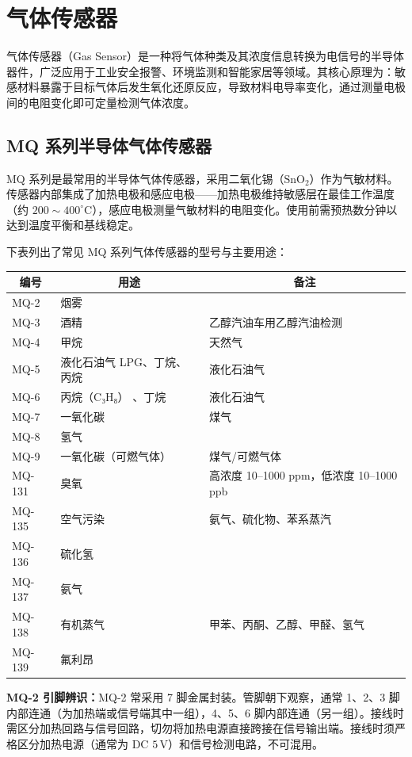 \section{气体传感器}
\label{sec:gas_sensors}

气体传感器（Gas Sensor）是一种将气体种类及其浓度信息转换为电信号的半导体器件，广泛应用于工业安全报警、环境监测和智能家居等领域。其核心原理为：敏感材料暴露于目标气体后发生氧化还原反应，导致材料电导率变化，通过测量电极间的电阻变化即可定量检测气体浓度。

\subsection{MQ 系列半导体气体传感器}

MQ 系列是最常用的半导体气体传感器，采用二氧化锡（$\mathrm{SnO_2}$）作为气敏材料。传感器内部集成了加热电极和感应电极——加热电极维持敏感层在最佳工作温度（约 $200\sim400^\circ\mathrm{C}$），感应电极测量气敏材料的电阻变化。使用前需预热数分钟以达到温度平衡和基线稳定。

下表列出了常见 MQ 系列气体传感器的型号与主要用途：

\vspace{0.5em}
\begin{center}
\begin{tabular}{lll}
\hline
\multicolumn{1}{c}{\textbf{编号}} & \multicolumn{1}{c}{\textbf{用途}} & \multicolumn{1}{c}{\textbf{备注}} \\
\hline
MQ-2   & 烟雾                         &                              \\
MQ-3   & 酒精                         & 乙醇汽油车用乙醇汽油检测      \\
MQ-4   & 甲烷                         & 天然气                       \\
MQ-5   & 液化石油气 LPG、丁烷、丙烷     & 液化石油气                       \\
MQ-6   & 丙烷（C₃H₈） 、丁烷           & 液化石油气                   \\
MQ-7   & 一氧化碳 & 煤气                         \\
MQ-8   & 氢气     &                              \\
MQ-9   & 一氧化碳（可燃气体） & 煤气/可燃气体                \\
MQ-131 & 臭氧     & 高浓度 10--1000 ppm，低浓度 10--1000 ppb  \\
MQ-135 & 空气污染 & 氨气、硫化物、苯系蒸汽       \\
MQ-136 & 硫化氢   &                              \\
MQ-137 & 氨气     &                              \\
MQ-138 & 有机蒸气 & 甲苯、丙酮、乙醇、甲醛、氢气 \\
MQ-139 & 氟利昂   &                              \\
\hline
\end{tabular}
\end{center}

\vspace{0.5em}

\textbf{MQ-2 引脚辨识：}MQ-2 常采用 7 脚金属封装。管脚朝下观察，通常 1、2、3 脚内部连通（为加热端或信号端其中一组），4、5、6 脚内部连通（另一组）。接线时需区分加热回路与信号回路，切勿将加热电源直接跨接在信号输出端。接线时须严格区分加热电源（通常为 DC $5\,\mathrm{V}$）和信号检测电路，不可混用。
